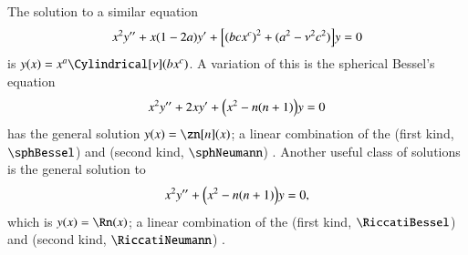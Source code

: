 









The solution to a similar equation%
\begin{equation}
    x^2y'' + x{(1-2a)}y'+ {\left[  {(bcx^{c})}^2 + {(a^2-\nu^2 c^2)}  \right]}y = 0
\end{equation}
is $y(x) = x^a \Cylindrical[\nu](bx^c)$. %
A variation of this is the spherical Bessel's equation
\begin{equation}
    x^2 y'' + 2x y' + {\left(  x^2 - n(n+1)  \right)}y = 0
\end{equation}
has the general solution $y(x)=\zn[n](x)$; a linear combination of the  (first kind, $\sphBessel$) and  (second kind, $\sphNeumann$) .
Another useful class of solutions is the general solution to
\begin{equation}
    x^2 y'' + {\left(  x^2 - n(n+1)  \right)}y = 0,
\end{equation}
which is $y(x)= \Rn(x)$; a linear combination of the  (first kind, $\RiccatiBessel$) and  (second kind, $\RiccatiNeumann$) .




